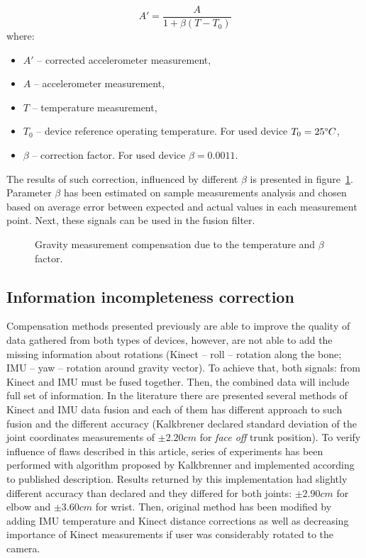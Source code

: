 \documentclass{llncs}
\begin{document}
\begin{equation}
	\label{eq:temperatureCompensation}
	A' = \frac{A}{1+\beta(T - T_0)}
\end{equation}
where:
\begin{itemize}
	\item $A'$ -- corrected accelerometer measurement,
	\item $A$ -- accelerometer measurement,
	\item $T$ -- temperature measurement,
	\item $T_0$ -- device reference operating temperature. For used device $T_0 = 25\degree C$,
	\item $\beta$ -- correction factor. For used device $\beta = 0.0011$.
\end{itemize}

The results of such correction, influenced by different $\beta$ is presented in figure~\ref{fig:characteristics:imu:imuTempCompensation}. Parameter $\beta$ has been estimated on sample measurements analysis and chosen based on average error between expected and actual values in each measurement point. Next, these signals can be used in the fusion filter. 

\begin{figure}[h!]
	\centering 
	\vspace{2.5cm}
	\caption{Gravity measurement compensation due to the temperature and $\beta$ factor.}
	\label{fig:characteristics:imu:imuTempCompensation}
\end{figure}

\subsection{Information incompleteness correction}
Compensation methods presented previously are able to improve the quality of data gathered from both types of devices, however, are not able to add the missing information about rotations (Kinect -- roll -- rotation along the bone; IMU -- yaw -- rotation around gravity vector). To achieve that, both signals: from Kinect and IMU must be fused together. Then, the combined data will include full set of information. In the literature there are presented several methods of Kinect and IMU data fusion \cite{Tian2015,Bo2011,Kalkbrenner2014} and each of them has different approach to such fusion and the different accuracy (Kalkbrener \cite{Kalkbrenner2014} declared standard deviation of the joint coordinates measurements of $\pm2.20cm$ for \textit{face off} trunk position). To verify influence of flaws described in this article, series of experiments has been performed with algorithm proposed by Kalkbrenner and implemented according to published description. Results returned by this implementation had slightly different accuracy than declared and they differed for both joints: $\pm2.90cm$ for elbow and  $\pm3.60cm$ for wrist. Then, original method has been modified by adding IMU temperature and Kinect distance corrections as well as decreasing importance of Kinect measurements if user was considerably rotated to the camera. 
\end{document}
